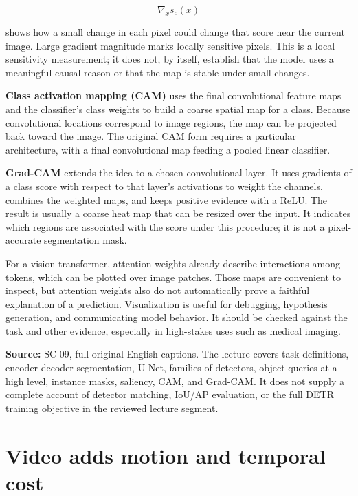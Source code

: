 \[
\nabla_x s_c(x)
\]

shows how a small change in each pixel could change that score near the current image. Large gradient magnitude marks locally sensitive pixels. This is a local sensitivity measurement; it does not, by itself, establish that the model uses a meaningful causal reason or that the map is stable under small changes.

\textbf{Class activation mapping (CAM)} uses the final convolutional feature maps and the classifier's class weights to build a coarse spatial map for a class. Because convolutional locations correspond to image regions, the map can be projected back toward the image. The original CAM form requires a particular architecture, with a final convolutional map feeding a pooled linear classifier.

\textbf{Grad-CAM} extends the idea to a chosen convolutional layer. It uses gradients of a class score with respect to that layer's activations to weight the channels, combines the weighted maps, and keeps positive evidence with a ReLU. The result is usually a coarse heat map that can be resized over the input. It indicates which regions are associated with the score under this procedure; it is not a pixel-accurate segmentation mask.

For a vision transformer, attention weights already describe interactions among tokens, which can be plotted over image patches. Those maps are convenient to inspect, but attention weights also do not automatically prove a faithful explanation of a prediction. Visualization is useful for debugging, hypothesis generation, and communicating model behavior. It should be checked against the task and other evidence, especially in high-stakes uses such as medical imaging.

\textbf{Source:} SC-09, full original-English captions. The lecture covers task definitions, encoder-decoder segmentation, U-Net, families of detectors, object queries at a high level, instance masks, saliency, CAM, and Grad-CAM. It does not supply a complete account of detector matching, IoU/AP evaluation, or the full DETR training objective in the reviewed lecture segment.

\section{Video adds motion and temporal cost}\label{04-visual-computing-ii-ch031-video-adds-motion-and-temporal-cost}

\hypertarget{04-visual-computing-ii-ch031-video-adds-motion-and-temporal-cost}{}

